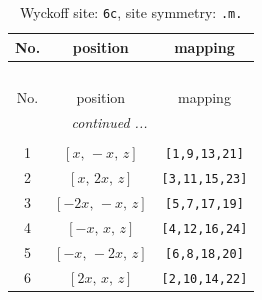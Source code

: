 \documentclass[fleqn,8pt]{jsarticle}
\begin{document}
\renewcommand{\arraystretch}{1.2}
\begin{longtable}{ccc}
\caption{Wyckoff site: {\tt 6c}, site symmetry: {\tt .m.}}
 \\
 \hline \hline
No. & position & mapping \\ \hline \endfirsthead

\multicolumn{2}{l}{\tablename\ \thetable{}} \\
 \hline \hline
No. & position & mapping \\ \hline \endhead

 \hline \hline
\multicolumn{2}{r}{\footnotesize\it continued ...} \\ \endfoot

 \hline \hline
\multicolumn{2}{r}{} \\ \endlastfoot

1 & $\left[ x,\, - x,\, z \right]$ & {\tt [1,9,13,21]} \\ \hline
2 & $\left[ x,\, 2 x,\, z \right]$ & {\tt [3,11,15,23]} \\ \hline
3 & $\left[ - 2 x,\, - x,\, z \right]$ & {\tt [5,7,17,19]} \\ \hline
4 & $\left[ - x,\, x,\, z \right]$ & {\tt [4,12,16,24]} \\ \hline
5 & $\left[ - x,\, - 2 x,\, z \right]$ & {\tt [6,8,18,20]} \\ \hline
6 & $\left[ 2 x,\, x,\, z \right]$ & {\tt [2,10,14,22]} \\
\end{longtable}
\renewcommand{\arraystretch}{1.2}
\end{document}

